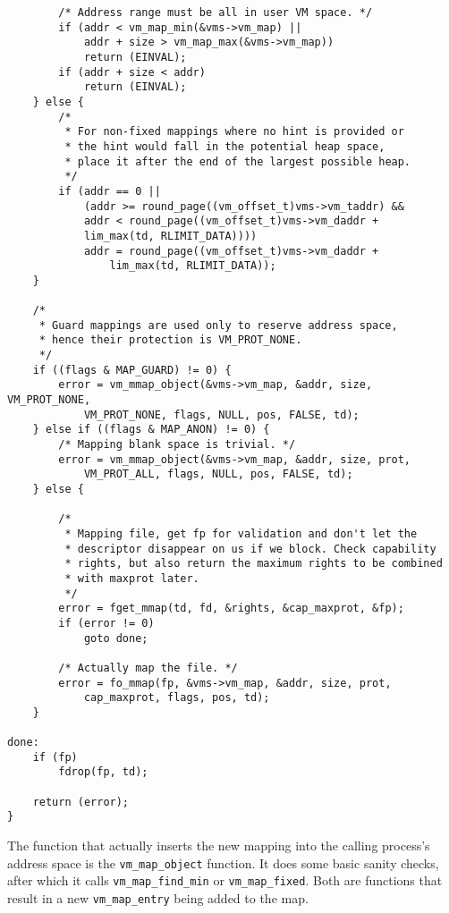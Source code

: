 \documentclass[shortabstract, english]{iithesis}
\newenvironment{code}{}{}
\begin{document}
\begin{code}
\begin{verbatim}
        /* Address range must be all in user VM space. */
        if (addr < vm_map_min(&vms->vm_map) ||
            addr + size > vm_map_max(&vms->vm_map))
            return (EINVAL);
        if (addr + size < addr)
            return (EINVAL);
    } else {
        /*
         * For non-fixed mappings where no hint is provided or
         * the hint would fall in the potential heap space,
         * place it after the end of the largest possible heap.
         */
        if (addr == 0 ||
            (addr >= round_page((vm_offset_t)vms->vm_taddr) &&
            addr < round_page((vm_offset_t)vms->vm_daddr +
            lim_max(td, RLIMIT_DATA))))
            addr = round_page((vm_offset_t)vms->vm_daddr +
                lim_max(td, RLIMIT_DATA));
    }

    /*
     * Guard mappings are used only to reserve address space,
     * hence their protection is VM_PROT_NONE.
     */
    if ((flags & MAP_GUARD) != 0) {
        error = vm_mmap_object(&vms->vm_map, &addr, size, VM_PROT_NONE,
            VM_PROT_NONE, flags, NULL, pos, FALSE, td);
    } else if ((flags & MAP_ANON) != 0) {
        /* Mapping blank space is trivial. */
        error = vm_mmap_object(&vms->vm_map, &addr, size, prot,
            VM_PROT_ALL, flags, NULL, pos, FALSE, td);
    } else {

        /*
         * Mapping file, get fp for validation and don't let the
         * descriptor disappear on us if we block. Check capability
         * rights, but also return the maximum rights to be combined
         * with maxprot later.
         */
        error = fget_mmap(td, fd, &rights, &cap_maxprot, &fp);
        if (error != 0)
            goto done;

        /* Actually map the file. */
        error = fo_mmap(fp, &vms->vm_map, &addr, size, prot,
            cap_maxprot, flags, pos, td);
    }

done:
    if (fp)
        fdrop(fp, td);

    return (error);
}
\end{verbatim}
\end{code}

The function that actually inserts the new mapping into the calling process's
address space is the \texttt{vm_map_object} function. It does some basic
sanity checks, after which it calls \texttt{vm_map_find_min} or
\texttt{vm_map_fixed}. Both are functions that result in a new
\texttt{vm_map_entry} being added to the map.
\end{document}

